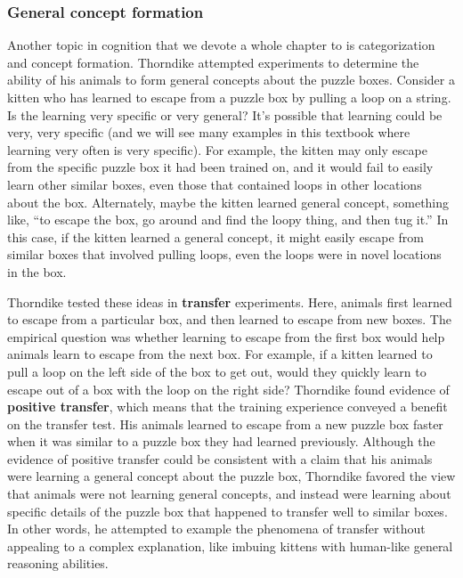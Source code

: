 \documentclass[
  oneside,
  12pt]{crumpbook}
\begin{document}
\hypertarget{general-concept-formation}{%
\subsubsection{General concept formation}\label{general-concept-formation}}

Another topic in cognition that we devote a whole chapter to is categorization and concept formation. Thorndike attempted experiments to determine the ability of his animals to form general concepts about the puzzle boxes. Consider a kitten who has learned to escape from a puzzle box by pulling a loop on a string. Is the learning very specific or very general? It's possible that learning could be very, very specific (and we will see many examples in this textbook where learning very often is very specific). For example, the kitten may only escape from the specific puzzle box it had been trained on, and it would fail to easily learn other similar boxes, even those that contained loops in other locations about the box. Alternately, maybe the kitten learned general concept, something like, ``to escape the box, go around and find the loopy thing, and then tug it.'' In this case, if the kitten learned a general concept, it might easily escape from similar boxes that involved pulling loops, even the loops were in novel locations in the box.

Thorndike tested these ideas in \textbf{transfer} experiments. Here, animals first learned to escape from a particular box, and then learned to escape from new boxes. The empirical question was whether learning to escape from the first box would help animals learn to escape from the next box. For example, if a kitten learned to pull a loop on the left side of the box to get out, would they quickly learn to escape out of a box with the loop on the right side? Thorndike found evidence of \textbf{positive transfer}, which means that the training experience conveyed a benefit on the transfer test. His animals learned to escape from a new puzzle box faster when it was similar to a puzzle box they had learned previously. Although the evidence of positive transfer could be consistent with a claim that his animals were learning a general concept about the puzzle box, Thorndike favored the view that animals were not learning general concepts, and instead were learning about specific details of the puzzle box that happened to transfer well to similar boxes. In other words, he attempted to example the phenomena of transfer without appealing to a complex explanation, like imbuing kittens with human-like general reasoning abilities.
\end{document}
